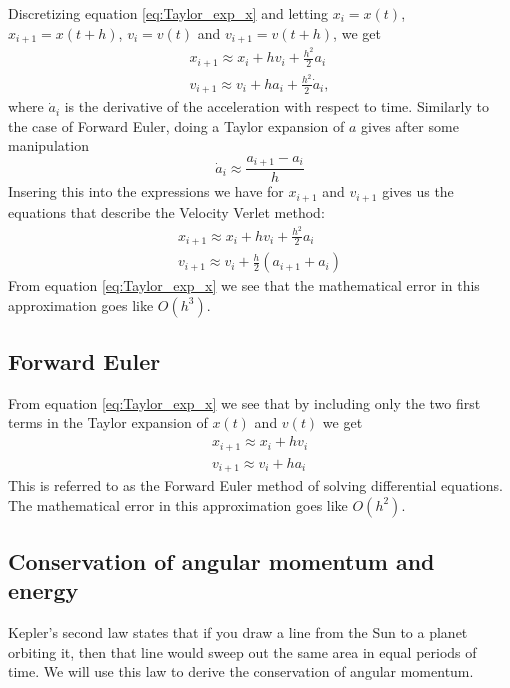 \documentclass[reprint, english,notitlepage,nofootinbib]{revtex4-1}  %
\begin{document}
Discretizing equation \ref{eq:Taylor_exp_x} and letting $x_i = x(t)$, $x_{i+1} = x(t + h)$, $v_i = v(t)$ and $v_{i+1} = v(t + h)$, we get
\begin{align*}
  x_{i+1} \approx x_i + h v_i + \frac{h^2}{2} a_i \\
  v_{i+1} \approx v_i + h a_i + \frac{h^2}{2} \dot a_i,
\end{align*}
where $\dot a_i$ is the derivative of the acceleration with respect to time. Similarly to the case of Forward Euler, doing a Taylor expansion of $a$ gives after some manipulation
\begin{equation}
  \dot a_i \approx \frac{a_{i+1} - a_i}{h}
\end{equation}
Insering this into the expressions we have for $x_{i+1}$ and $v_{i+1}$ gives us the equations that describe the Velocity Verlet method:
\begin{align*}
  x_{i+1} \approx x_i + h v_i + \frac{h^2}{2} a_i \\
  v_{i+1} \approx v_i + \frac{h}{2} (a_{i+1} + a_i)
\end{align*}
From equation \ref{eq:Taylor_exp_x} we see that the mathematical error in this approximation goes like $O(h^3)$.


\subsection{Forward Euler}

From equation \ref{eq:Taylor_exp_x} we see that by including only the two first terms in the Taylor expansion of $x(t)$ and $v(t)$ we get
\begin{align*}
  x_{i+1} \approx x_i + h v_i \\
  v_{i+1} \approx v_i + h a_i
\end{align*}
This is referred to as the Forward Euler method of solving differential equations. The mathematical error in this approximation goes like $O(h^2)$.


\subsection{Conservation of angular momentum and energy}

Kepler's second law states that if you draw a line from the Sun to a planet orbiting it, then that line would sweep out the same area in equal periods of time. We will use this law to derive the conservation of angular momentum.
\end{document}
